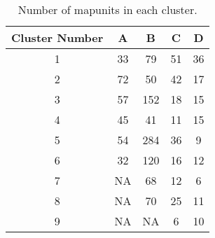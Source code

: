 	\begin{table}[h!]
	\caption{Number of mapunits in each cluster.}
	\centering
		\begin{tabular}{c c c c c}
			\hline 
			Cluster Number	 & 	A	 & 	B	 & 	C	 & 	D \\
			\hline \hline
			1 & 33	& 79	& 51	& 36  \\
			2 & 72	& 50	& 42	& 17  \\
			3 & 57	& 152	& 18	& 15  \\
			4 & 45	& 41	& 11	& 15  \\
			5 & 54	& 284	& 36	& 9   \\
			6 & 32	& 120	& 16	& 12  \\
			7 & NA	& 68	& 12	& 6   \\
			8 & NA	& 70	& 25	& 11  \\
			9 & NA	& NA  	& 6 	& 10  \\
			\hline		
		\end{tabular}
		
		\label{table:soil_clust}
	\end{table}	